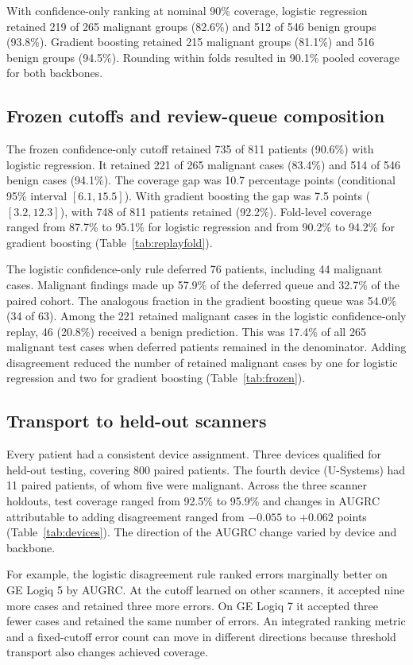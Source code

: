 \documentclass[11pt]{article}
\begin{document}
With confidence-only ranking at nominal 90\% coverage, logistic regression retained 219 of 265 malignant groups (82.6\%) and 512 of 546 benign groups (93.8\%). Gradient boosting retained 215 malignant groups (81.1\%) and 516 benign groups (94.5\%). Rounding within folds resulted in 90.1\% pooled coverage for both backbones.

\subsection{Frozen cutoffs and review-queue composition}
The frozen confidence-only cutoff retained 735 of 811 patients (90.6\%) with logistic regression. It retained 221 of 265 malignant cases (83.4\%) and 514 of 546 benign cases (94.1\%). The coverage gap was 10.7 percentage points (conditional 95\% interval $[6.1,15.5]$). With gradient boosting the gap was 7.5 points ($[3.2,12.3]$), with 748 of 811 patients retained (92.2\%). Fold-level coverage ranged from 87.7\% to 95.1\% for logistic regression and from 90.2\% to 94.2\% for gradient boosting (Table~\ref{tab:replayfold}).

The logistic confidence-only rule deferred 76 patients, including 44 malignant cases. Malignant findings made up 57.9\% of the deferred queue and 32.7\% of the paired cohort. The analogous fraction in the gradient boosting queue was 54.0\% (34 of 63). Among the 221 retained malignant cases in the logistic confidence-only replay, 46 (20.8\%) received a benign prediction. This was 17.4\% of all 265 malignant test cases when deferred patients remained in the denominator. Adding disagreement reduced the number of retained malignant cases by one for logistic regression and two for gradient boosting (Table~\ref{tab:frozen}).

\subsection{Transport to held-out scanners}

Every patient had a consistent device assignment. Three devices qualified for held-out testing, covering 800 paired patients. The fourth device (U-Systems) had 11 paired patients, of whom five were malignant. Across the three scanner holdouts, test coverage ranged from 92.5\% to 95.9\% and changes in AUGRC attributable to adding disagreement ranged from $-0.055$ to $+0.062$ points (Table~\ref{tab:devices}). The direction of the AUGRC change varied by device and backbone.

For example, the logistic disagreement rule ranked errors marginally better on GE Logiq 5 by AUGRC. At the cutoff learned on other scanners, it accepted nine more cases and retained three more errors. On GE Logiq 7 it accepted three fewer cases and retained the same number of errors. An integrated ranking metric and a fixed-cutoff error count can move in different directions because threshold transport also changes achieved coverage.
\end{document}
